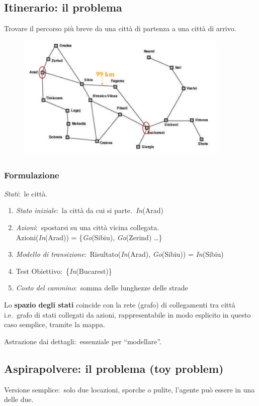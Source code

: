 \subsection{Itinerario: il problema}
Trovare il percorso più breve da una città di partenza a una città di arrivo.
\begin{figure}[H]
	\centering
	\includegraphics[width=0.9\textwidth]{immagini/Itinerario.png}
\end{figure}

\subsubsection{Formulazione}

\textit{Stati}:\ le città.
\begin{enumerate}
	\item \textit{Stato iniziale}:\ la città da cui si parte.\ \textit{In}(Arad)
	\item \textit{Azioni}:\ spostarsi su una città vicina collegata.\\ Azioni(\textit{In}(Arad)) = \{\textit{Go}(Sibiu), \textit{Go}(Zerind) \dots \}
	\item \textit{Modello di transizione}:\ Risultato(\textit{In}(Arad), \textit{Go}(Sibiu)) = \textit{In}(Sibiu)
	\item Test Obiettivo:\ \{\textit{In}(Bucarest)\}
	\item \textit{Costo del cammino}:\ somma delle lunghezze delle strade
\end{enumerate}
Lo \textbf{spazio degli stati} coincide con la rete (grafo) di collegamenti tra città i.e.\ grafo di stati collegati da azioni, rappresentabile in modo esplicito in questo caso semplice, tramite la mappa.

Astrazione dai dettagli:\ essenziale per ``modellare''.
\newpage
\subsection{Aspirapolvere: il problema (toy problem)}
Versione semplice:\ solo due locazioni, sporche o pulite, l'agente può essere in una delle due.

